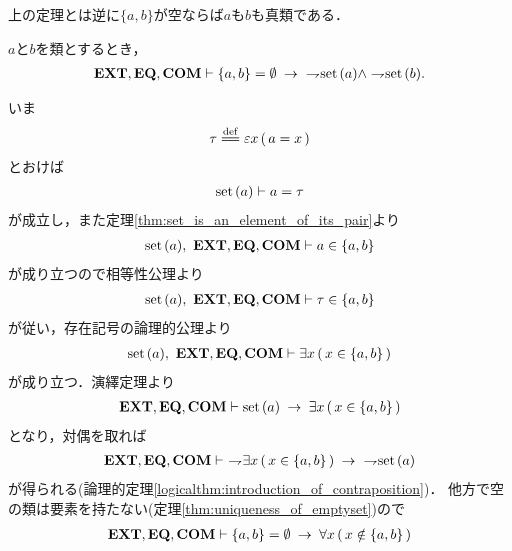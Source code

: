 	上の定理とは逆に$\{a,b\}$が空ならば$a$も$b$も真類である．
	
	\begin{screen}
		\begin{thm}[空な対に表示されている類は集合ではない]
		\label{thm:classes_displayed_in_empty_pair_are_not_sets}
			$a$と$b$を類とするとき，
			\begin{align}
				\EXTAX,\EQAX,\COMAX \vdash \{a,b\} = \emptyset \rarrow\ \negation \set{a} \wedge \negation \set{b}.
			\end{align}
		\end{thm}
	\end{screen}
	
	\begin{sketch}
		いま
		\begin{align}
			\tau \defeq \varepsilon x\, (\, a = x\, )
		\end{align}
		とおけば
		\begin{align}
			\operatorname*{set}\hspace{0.15em}(a) \vdash a = \tau
		\end{align}
		が成立し，また定理\ref{thm:set_is_an_element_of_its_pair}より
		\begin{align}
			\operatorname*{set}\hspace{0.15em}(a),\ \mbox{{\bf EXT}},\mbox{{\bf EQ}},\mbox{\bf COM} \vdash a \in \{a,b\}
		\end{align}
		が成り立つので相等性公理より
		\begin{align}
			\operatorname*{set}\hspace{0.15em}(a),\ \mbox{{\bf EXT}},\mbox{{\bf EQ}},\mbox{\bf COM} \vdash \tau \in \{a,b\}
		\end{align}
		が従い，存在記号の論理的公理より
		\begin{align}
			\operatorname*{set}\hspace{0.15em}(a),\ \mbox{{\bf EXT}},\mbox{{\bf EQ}},\mbox{\bf COM} \vdash \exists x\, (\, x \in \{a,b\}\, )
		\end{align}
		が成り立つ．演繹定理より
		\begin{align}
			\mbox{{\bf EXT}},\mbox{{\bf EQ}},\mbox{\bf COM} \vdash \operatorname*{set}\hspace{0.15em}(a) \hspace{0.25em}\rightarrow\hspace{0.25em} \exists x\, (\, x \in \{a,b\}\, )
		\end{align}
		となり，対偶を取れば
		\begin{align}
			\mbox{{\bf EXT}},\mbox{{\bf EQ}},\mbox{\bf COM} \vdash\ \rightharpoondown\hspace{-0.25em} \exists x\, (\, x \in \{a,b\}\, )
			\hspace{0.25em}\rightarrow\hspace{0.25em}\ \rightharpoondown\hspace{-0.25em} \operatorname*{set}\hspace{0.15em}(a)
			\label{fom:classes_displayed_in_empty_pair_are_not_sets_1}
		\end{align}
		が得られる(論理的定理\ref{logicalthm:introduction_of_contraposition})．
		他方で空の類は要素を持たない(定理\ref{thm:uniqueness_of_emptyset})ので
		\begin{align}
			\mbox{{\bf EXT}},\mbox{{\bf EQ}},\mbox{\bf COM} \vdash \{a,b\} = \emptyset \hspace{0.25em}\rightarrow\hspace{0.25em} \forall x\, (\, x \notin \{a,b\}\, )
			\label{fom:classes_displayed_in_empty_pair_are_not_sets_2}
		\end{align}

\end{sketch}
